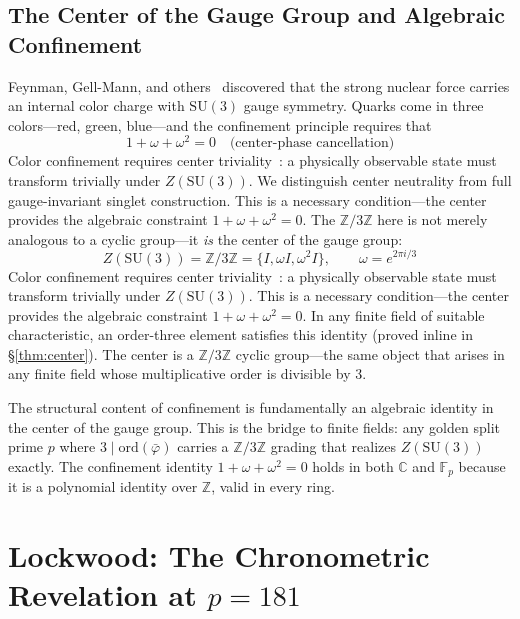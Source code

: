 \documentclass[12pt,oneside]{article}
\theoremstyle{principia}
\theoremstyle{definition}
\theoremstyle{remark}
\providecommand{\CC}{\mathbb{C}}
\providecommand{\ZZ}{\mathbb{Z}}
\providecommand{\FF}{\mathbb{F}}
\providecommand{\vpbar}{\bar{\varphi}}
\begin{document}
\subsection{The Center of the Gauge Group and Algebraic Confinement}

Feynman, Gell-Mann, and others~\cite{feynman_qcd,gellmann} discovered that the strong nuclear force carries an internal color charge with $\mathrm{SU}(3)$ gauge symmetry. Quarks come in three colors---red, green, blue---and the confinement principle requires that 
\begin{equation}\label{eq:confinement}
1 + \omega + \omega^2 = 0 \quad \text{(center-phase cancellation)}
\end{equation}
Color confinement requires center triviality~\cite{greensite}: a physically observable state must transform trivially under $Z(\mathrm{SU}(3))$. We distinguish center neutrality from full gauge-invariant singlet construction. This is a necessary condition---the center provides the algebraic constraint $1 + \omega + \omega^2 = 0$. The $\ZZ/3\ZZ$ here is not merely analogous to a cyclic group---it \emph{is} the center of the gauge group:
\begin{equation}\label{eq:center}
Z(\mathrm{SU}(3)) = \ZZ/3\ZZ = \{I, \omega I, \omega^2 I\}, \qquad \omega = e^{2\pi i/3}
\end{equation}
Color confinement requires center triviality~\cite{greensite}: a physically observable state must transform trivially under $Z(\mathrm{SU}(3))$. This is a necessary condition---the center provides the algebraic constraint $1 + \omega + \omega^2 = 0$. In any finite field of suitable characteristic, an order-three element satisfies this identity (proved inline in \S\ref{thm:center}). The center is a $\ZZ/3\ZZ$ cyclic group---the same object that arises in any finite field whose multiplicative order is divisible by 3.

The structural content of confinement is fundamentally an algebraic identity in the center of the gauge group. This is the bridge to finite fields: any golden split prime $p$ where $3 \mid \mathrm{ord}(\vpbar)$ carries a $\ZZ/3\ZZ$ grading that realizes $Z(\mathrm{SU}(3))$ exactly. The confinement identity $1 + \omega + \omega^2 = 0$ holds in both $\CC$ and $\FF_p$ because it is a polynomial identity over $\ZZ$, valid in every ring.


\section{Lockwood: The Chronometric Revelation at $p = 181$}
\end{document}
